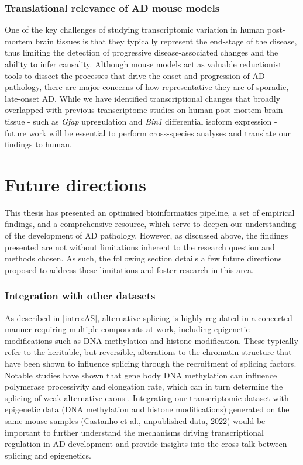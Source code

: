 \subsubsection{Translational relevance of AD mouse models}
One of the key challenges of studying transcriptomic variation in human post-mortem brain tissues is that they typically represent the end-stage of the disease, thus limiting the detection of progressive disease-associated changes and the ability to infer causality. Although mouse models act as valuable reductionist tools to dissect the processes that drive the onset and progression of AD pathology, there are major concerns of how representative they are of sporadic, late-onset AD. While we have identified transcriptional changes that broadly overlapped with previous transcriptome studies on human post-mortem brain tissue - such as \textit{Gfap} upregulation and \textit{Bin1} differential isoform expression - future work will be essential to perform cross-species analyses and translate our findings to human.      

\section{Future directions}
This thesis has presented an optimised bioinformatics pipeline, a set of empirical findings, and a comprehensive resource, which serve to deepen our understanding of the development of AD pathology. However, as discussed above, the findings presented are not without limitations inherent to the research question and methods chosen. As such, the following section details a few future directions proposed to address these limitations and foster research in this area.   

\subsubsection{Integration with other datasets} 
As described in \cref{intro:AS}, alternative splicing is highly regulated in a concerted manner requiring multiple components at work, including epigenetic modifications such as DNA methylation and histone modification. These typically refer to the heritable, but reversible, alterations to the chromatin structure that have been shown to influence splicing through the recruitment of splicing factors\cite{Yang2014, Shukla2011, Zhang2020a, Shukla2011, Luco2011}. Notable studies have shown that gene body DNA methylation can influence polymerase processivity and elongation rate, which can in turn determine the splicing of weak alternative exons \cite{Yang2014, Shukla2011}. Integrating our transcriptomic dataset with epigenetic data (DNA methylation and histone modifications) generated on the same mouse samples (Castanho et al., unpublished data, 2022) would be important to further understand the mechanisms driving transcriptional regulation in AD development and provide insights into the cross-talk between splicing and epigenetics. 

